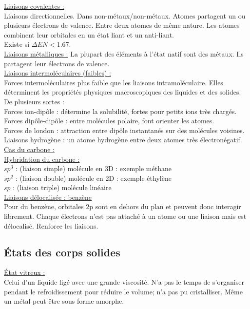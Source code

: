 \documentclass[../main.tex]{subfiles}
\begin{document}
\quad \underline{Liaisons covalentes :}\\
Liaisons directionnelles. Dans non-métaux/non-métaux. Atomes partagent un ou plusieurs électrons de valence. Entre deux atomes de même nature. Les atomes combinent leur orbitales en un état liant et un anti-liant. \\
Existe si $\Delta EN < 1.67$. \\

\quad \underline{Liaisons métalliques :}
La plupart des éléments à l'état natif sont des métaux. Ils partagent leur électrons de valence. \\

\quad \underline{Liaisons intermoléculaires (faibles) :}\\
Forces intermoléculaires plus faible que les liaisons intramoléculaire. Elles déterminent les propriétés physiques macroscopiques des liquides et des solides. De plusieurs sortes :\\
Forces ion-dipôle : détermine la solubilité, fortes pour petits ions très chargés.\\
Forces dipôle-dipôle : entre molécules polaire, font orienter les atomes.\\
Forces de london : attraction entre dipôle instantanés sur des molécules voisines.\\
Liaisons hydrogène : un atome hydrogène entre deux atomes très électronégatif.\\

\quad \underline{Cas du carbone :}\\
\qquad \underline{Hybridation du carbone :}\\
$sp^3$ : (liaison simple) molécule en 3D : exemple méthane\\
$sp^2$ : (liaison double) molécule en 2D : exemple éthylène\\
$sp$ : (liaison triple) molécule linéaire\\


\quad \underline{Liaisons délocalisée : benzène }\\
Pour du benzène, orbitales 2p sont en dehors du plan et peuvent donc interagir librement. Chaque électrons n'est pas attaché à un atome ou une liaison mais est délocalisé. Renforce les liaisons. \\

\subsection{États des corps solides}
\quad \underline{État vitreux :}\\
Celui d'un liquide figé avec une grande viscosité. N'a pas le temps de s'organiser pendant le refroidissement pour réduire le volume; n'a pas pu cristalliser. Même un métal peut être sous forme amorphe.\\
\end{document}

